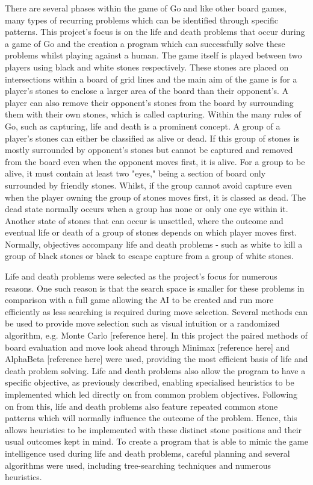 \documentclass{l3proj}
\begin{document}
There are several phases within the game of Go and like other board games, many types of recurring problems which can be identified through specific patterns. This project's focus is on the life and death problems that occur during a game of Go and the creation a program which can successfully solve these problems whilst playing against a human. The game itself is played between two players using black and white stones respectively. These stones are placed on intersections within a board of grid lines and the main aim of the game is for a player's stones to enclose a larger area of the board than their opponent's. A player can also remove their opponent's stones from the board by surrounding them with their own stones, which is called capturing. Within the many rules of Go, such as capturing, life and death is a prominent concept. A group of a player's stones can either be classified as alive or dead. If this group of stones is mostly surrounded by opponent's stones but cannot be captured and removed from the board even when the opponent moves first, it is alive. For a group to be alive, it must contain at least two "eyes," being a section of board only surrounded by friendly stones. Whilst, if the group cannot avoid capture even when the player owning the group of stones moves first, it is classed as dead. The dead state normally occurs when a group has none or only one eye within it. Another state of stones that can occur is unsettled, where the outcome and eventual life or death of a group of stones depends on which player moves first. Normally, objectives accompany life and death problems - such as white to kill a group of black stones or black to escape capture from a group of white stones.

Life and death problems were selected as the project's focus for numerous reasons. One such reason is that the search space is smaller for these problems in comparison with a full game allowing the AI to be created and run more efficiently as less searching is required during move selection. Several methods can be used to provide move selection such as visual intuition or a randomized algorithm, e.g. Monte Carlo [reference here]. In this project the paired methods of board evaluation and move look ahead through Minimax [reference here] and AlphaBeta [reference here] were used, providing the most efficient basis of life and death problem solving. Life and death problems also allow the program to have a specific objective, as previously described, enabling specialised heuristics to be implemented which led directly on from common problem objectives. Following on from this, life and death problems also feature repeated common stone patterns which will normally influence the outcome of the problem. Hence, this allows heuristics to be implemented with these distinct stone positions and their usual outcomes kept in mind. To create a program that is able to mimic the game intelligence used during life and death problems, careful planning and several algorithms were used, including tree-searching techniques and numerous heuristics.
\end{document}
